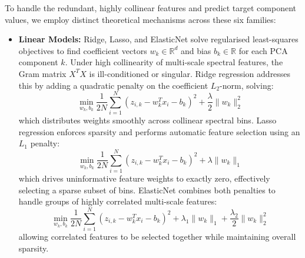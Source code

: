 \documentclass[12pt]{article}
\begin{document}
To handle the redundant, highly collinear features and predict target component values, we employ distinct theoretical mechanisms across these six families:

\begin{itemize}
\item \textbf{Linear Models:} Ridge, Lasso, and ElasticNet solve regularised least-squares objectives to find coefficient vectors $w_k \in \mathbb{R}^d$ and bias $b_k \in \mathbb{R}$ for each PCA component $k$. Under high collinearity of multi-scale spectral features, the Gram matrix $X^T X$ is ill-conditioned or singular. Ridge regression addresses this by adding a quadratic penalty on the coefficient $L_2$-norm, solving:
\[
\min_{w_k,b_k} \frac{1}{2N} \sum_{i=1}^N \left(z_{i,k} - w_k^T x_i - b_k\right)^2 + \frac{\lambda}{2} \|w_k\|_2^2
\]
which distributes weights smoothly across collinear spectral bins. Lasso regression enforces sparsity and performs automatic feature selection using an $L_1$ penalty:
\[
\min_{w_k,b_k} \frac{1}{2N} \sum_{i=1}^N \left(z_{i,k} - w_k^T x_i - b_k\right)^2 + \lambda \|w_k\|_1
\]
which drives uninformative feature weights to exactly zero, effectively selecting a sparse subset of bins. ElasticNet combines both penalties to handle groups of highly correlated multi-scale features:
\[
\min_{w_k,b_k} \frac{1}{2N} \sum_{i=1}^N \left(z_{i,k} - w_k^T x_i - b_k\right)^2 + \lambda_1 \|w_k\|_1 + \frac{\lambda_2}{2} \|w_k\|_2^2
\]
allowing correlated features to be selected together while maintaining overall sparsity.


\end{itemize}
\end{document}
